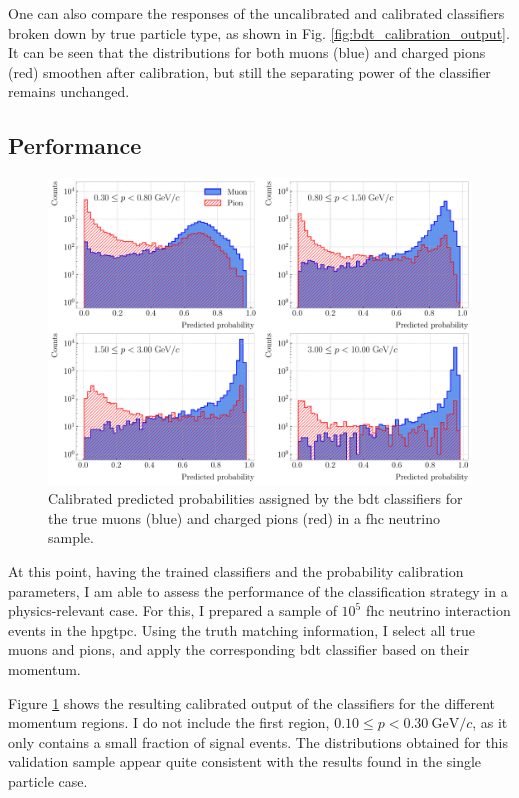 One can also compare the responses of the uncalibrated and calibrated classifiers broken down by true particle type, as shown in Fig. \ref{fig:bdt_calibration_output}. It can be seen that the distributions for both muons (blue) and charged pions (red) smoothen after calibration, but still the separating power of the classifier remains unchanged.

\subsection{Performance}

\begin{figure}[t]
	\centering
	\includegraphics[width=.95\linewidth]{Images/GArSoft_PID/BDT/ecal_bdt_validation_output_regions.pdf}
	\caption[Calibrated predicted probabilities assigned by the \gls{bdt} classifiers for the true muons and charged pions in a \gls{fhc} neutrino sample.]{Calibrated predicted probabilities assigned by the \gls{bdt} classifiers for the true muons (blue) and charged pions (red) in a \gls{fhc} neutrino sample.}
	\label{fig:bdt_validation_output}
\end{figure}

At this point, having the trained classifiers and the probability calibration parameters, I am able to assess the performance of the classification strategy in a physics-relevant case. For this, I prepared a sample of $10^{5}$ \gls{fhc} neutrino interaction events in the \gls{hpgtpc}. Using the truth matching information, I select all true muons and pions, and apply the corresponding \gls{bdt} classifier based on their momentum.

Figure \ref{fig:bdt_validation_output} shows the resulting calibrated output of the classifiers for the different momentum regions. I do not include the first region, $0.10 \leq p < 0.30 ~ \mathrm{GeV}/c$, as it only contains a small fraction of signal events. The distributions obtained for this validation sample appear quite consistent with the results found in the single particle case.

